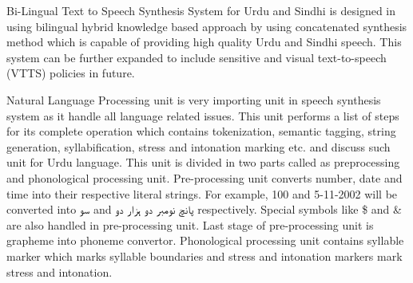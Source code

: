 Bi-Lingual Text to Speech Synthesis 
System for Urdu and Sindhi is designed in \cite{shah2004bi} using
bilingual hybrid knowledge based approach by using concatenated synthesis method which is capable of providing high quality 
Urdu and Sindhi speech. This system can be further expanded to include sensitive and visual text-to-speech (VTTS) policies in future.

Natural Language Processing unit is very importing unit in speech synthesis system as it handle all language related issues.
This unit performs a list of steps for its complete operation which contains tokenization, semantic tagging, string generation,
syllabification, stress and intonation marking etc. \cite{saleem2002urdu} and \cite{urdu_text_preprocessing} discuss such unit for Urdu language. This unit is divided in two parts called as preprocessing and phonological processing unit. Pre-processing unit converts number, date and time into their respective literal strings. For example, 100 and 5-11-2002 will be converted into \texturdu{سو} and \texturdu{پانچ نومبر دو ہزار دو} respectively. Special symbols like \$ and & are also handled in pre-processing unit. Last stage of pre-processing unit is grapheme into phoneme convertor. Phonological processing unit contains syllable marker which marks syllable boundaries and stress and
intonation markers mark stress and intonation. 



